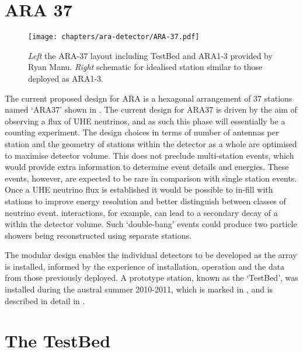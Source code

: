 \section{ARA 37}
\label{sec:ara-detector:ARA37}

\begin{figure}[htpb]
  \centering
  \texttt{[image: chapters/ara-detector/ARA-37.pdf]}
  \caption{\textit{Left} the ARA-37 layout including TestBed and ARA1-3 provided by Ryan Manu. \textit{Right} schematic for idealised station similar to those deployed as ARA1-3.}
  \label{fig:ara-detector:ARA-37:ARA-37}
\end{figure}

The current proposed design for ARA is a hexagonal arrangement of 37 stations named `ARA37' shown in . The current design for ARA37 is driven by the aim of observing a flux of UHE neutrinos, and as such this phase will essentially be a counting experiment. The design choices in terms of number of antennas per station and the geometry of stations within the detector as a whole are optimised to maximise detector volume. This does not preclude multi-station events, which would provide extra information to determine event details and energies. These events, however, are expected to be rare in comparison with single station events. Once a UHE neutrino flux is established it would be possible to in-fill with stations to improve energy resolution and better distinguish between classes of neutrino event. \Pnut interactions, for example, can lead to a secondary decay of a \Ptau within the detector volume. Such `double-bang' events could produce two particle showers being reconstructed using separate stations.


The modular design enables the individual detectors to be developed as the array is installed, informed by the experience of installation, operation and the data from those previously deployed. A prototype station, known as the `TestBed', was installed during the austral summer 2010-2011, which is marked in , and is described in detail in . 



\section{The TestBed}
\label{sec:ara-detector:TestBed}

